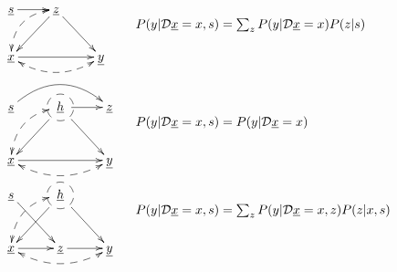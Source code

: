 \begin{figure}[h!]
$$
\begin{array}{ll}
\xymatrix{
\rvs\ar[r]
&\rvz\ar[dl]\ar[dr]\ar@{<-->}@/_1pc/[dl]
\\
\rvx\ar[rr]\ar@{<-->}@/_1pc/[rr]
&&\rvy
}
&
\begin{array}{l}
\\
\\
P(y|\cald \rvx=x, s)=
\sum_z
P(y|\cald \rvx=x)P(z|s)
\end{array}
\\
\\
\xymatrix{
\rvs\ar@/^1.5pc/[rr]
&*++[F-o]{\rvh}\ar[dl]\ar[dr]\ar[r]
\ar@{<-->}@/_1pc/[dl]
&\rvz
\\
\rvx\ar[rr]\ar@{<-->}@/_1pc/[rr]
&&\rvy
}
&
\begin{array}{l}
\\
\\
P(y|\cald \rvx=x, s)=
P(y|\cald \rvx=x)
\end{array}
\\
\xymatrix{
\rvs\ar[rd]
&*++[F-o]{\rvh}\ar[dl]\ar[dr]
\ar@{<-->}@/_1pc/[dl]
\\
\rvx\ar[r]\ar@{<-->}@/_1pc/[rr]
&\rvz\ar[r]
&\rvy
}
&
\begin{array}{l}
\\
\\
P(y|\cald \rvx=x, s)=
\sum_z
P(y|\cald \rvx=x, z)P(z|x, s)
\end{array}
\end{array}
$$
\end{figure}
